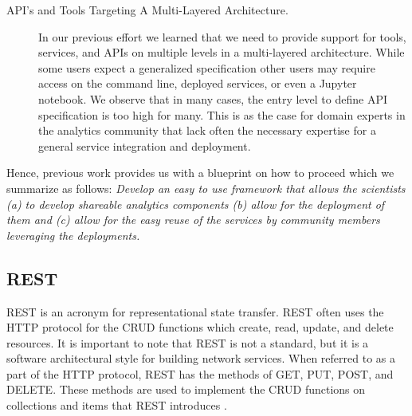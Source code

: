 \begin{description}
\item[API's and Tools Targeting A Multi-Layered Architecture.] In our
  previous effort we learned that we need to provide support for
  tools, services, and APIs on multiple levels in a multi-layered
  architecture. While some users expect a generalized specification
  other users may require access on the command line, deployed
  services, or even a Jupyter notebook. We observe that in many cases,
  the entry level to define API specification is too high for
  many. This is as the case for domain experts in the analytics community that lack often the necessary expertise for a general service integration and deployment.

\end{description}

Hence, previous work provides us with a blueprint on how to proceed which we summarize as follows: {\em Develop an easy to use framework that allows the scientists (a) to develop shareable analytics components (b) allow for the deployment of them and (c) allow for the easy reuse of the services by community members leveraging the deployments.} 



\subsection{REST}\label{rest}

REST is an acronym for representational state transfer. REST often uses
the HTTP protocol for the CRUD functions which create, read, update, and
delete resources. It is important to note that REST is not a standard,
but it is a software architectural style for building network services.
When referred to as a part of the HTTP protocol, REST has the methods of
GET, PUT, POST, and DELETE. These methods are used to implement the CRUD
functions on collections and items that REST introduces
\cite{las-book-cloud}.
 
